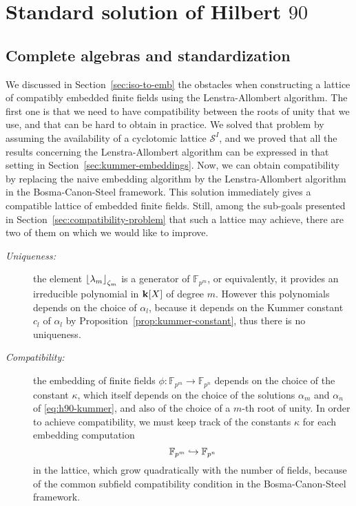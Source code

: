 \section{Standard solution of Hilbert $90$}
\label{sec:standard-solution}

\subsection{Complete algebras and standardization}
\label{sec:standardization}

We discussed in Section~\ref{sec:iso-to-emb} the 
obstacles when constructing a lattice of compatibly embedded finite fields using
the Lenstra-Allombert algorithm. The first one is that we need to have compatibility
between the roots of unity that we use, and that can be hard to obtain in
practice. We solved that problem by assuming the availability of a
cyclotomic lattice $\mathcal S^I$, and we proved that all the results concerning
the Lenstra-Allombert algorithm can be expressed in that setting in
Section~\ref{sec:kummer-embeddings}. Now, we can obtain compatibility by
replacing the naive embedding algorithm by the Lenstra-Allombert algorithm in
the Bosma-Canon-Steel framework. This solution immediately gives a compatible
lattice of embedded finite fields. Still, among the sub-goals presented in
Section~\ref{sec:compatibility-problem} that such a lattice may achieve, there
are two of them on which we would like to improve.
\begin{description}
  \item[\emph{Uniqueness:}] the element $\left\lfloor \lambda_m \right\rfloor_{\zeta_m}$ is
    a generator of $\mathbb{F}_{p^{m}}$, or equivalently, it provides an
    irreducible polynomial in $\mathbf{k}[X]$ of degree $m$. However this polynomials
    depends on the choice of $\alpha_l$, because it depends on the Kummer constant
    $c_l$ of $\alpha_l$ by Proposition~\ref{prop:kummer-constant}, thus there is
    no uniqueness.
  \item[\emph{Compatibility:}] the embedding of finite fields
    $\phi:\mathbb{F}_{p^{m}}\to\mathbb{F}_{p^{n}}$ depends on
    the choice of the constant $\kappa$, which itself depends on the choice of
    the solutions $\alpha_m$ and $\alpha_n$ of \eqref{eq:h90-kummer}, and also
    of the choice of a $m$-th root of unity. In order to achieve compatibility,
    we must keep track of the constants $\kappa$ for each embedding computation
    \[
      \mathbb{F}_{p^{m}}\hookrightarrow\mathbb{F}_{p^{n}}
    \]
    in the
    lattice, which grow quadratically with the number of fields, because of the
    common subfield compatibility condition in the Bosma-Canon-Steel framework.
\end{description}
